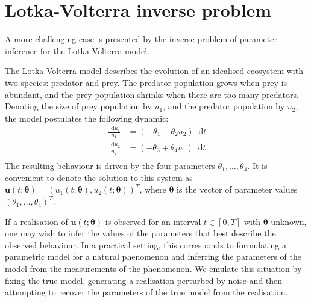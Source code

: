 \documentclass[11pt,a4paper]{report}
\newcommand*\diff{\mathop{}\!\mathrm{d}}
\begin{document}
\section{Lotka-Volterra inverse problem}

A more challenging case is presented by the inverse problem of parameter inference for the Lotka-Volterra model.


The Lotka-Volterra model describes the evolution of an idealised ecosystem with two species: predator and prey. The predator population grows when prey is abundant, and the prey population shrinks when there are too many predators. Denoting the size of prey population by $u_1$, and the predator population by $u_2$, the model postulates the following dynamic:
\begin{equation}
\begin{aligned}
\frac{\diff u_1}{u_1} & = ( \;\;\;\theta_1 - \theta_2 u_2 ) \diff t \\
\frac{\diff u_2}{u_2} & = ( -\theta_3 + \theta_4 u_1 ) \diff t \\
\end{aligned}
\label{eq:lotka-volterra}
\end{equation}
The resulting behaviour is driven by the four parameters $\theta_1, \dots, \theta_4$. It is convenient to denote the solution to this system as  $\mathbf{u}(t;\pmb{\theta}) = (u_1(t; \pmb{\theta}), u_2(t; \pmb{\theta}))^T$, where $\pmb{\theta}$ is the vector of parameter values $(\theta_1, \dots, \theta_4)^T$.

If a realisation of $\mathbf{u}(t; \pmb{\theta})$ is observed for an interval $t \in [0, T]$ with $\pmb{\theta}$ unknown, one may wish to infer the values of the parameters that best describe the observed behaviour. In a practical setting, this corresponds to formulating a parametric model for a natural phenomenon and inferring the parameters of the model from the measurements of the phenomenon. We emulate this situation by fixing the true model, generating a realisation perturbed by noise and then attempting to recover the parameters of the true model from the realisation.
\end{document}
